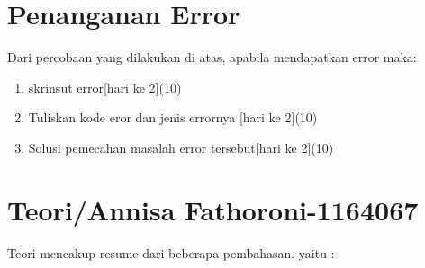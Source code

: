 \section{Penanganan Error}
Dari percobaan yang dilakukan di atas, apabila mendapatkan error maka:

\begin{enumerate}
	\item
	skrinsut error[hari ke 2](10)
	\item
Tuliskan kode eror dan jenis errornya [hari ke 2](10)
	\item
Solusi pemecahan masalah error tersebut[hari ke 2](10)

\end{enumerate}



\section{Teori/Annisa Fathoroni-1164067}
Teori mencakup resume dari beberapa pembahasan. yaitu :
